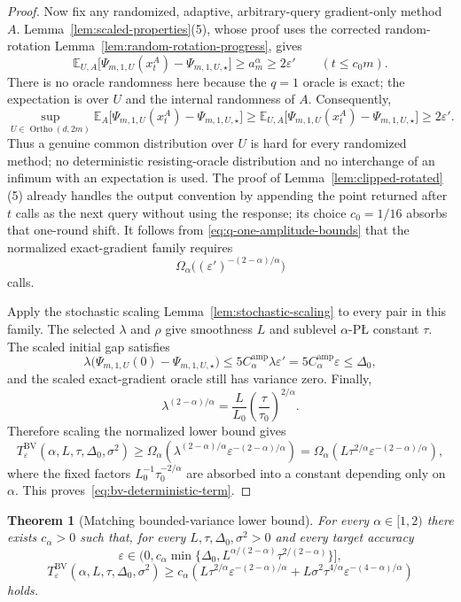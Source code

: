 \documentclass[11pt]{article}
\newtheorem{theorem}{Theorem}[section]
\newcommand{\E}{\mathbb{E}}
\newcommand{\Ortho}{\operatorname{Ortho}}
\begin{document}
\begin{proof}
Now fix any randomized, adaptive, arbitrary-query gradient-only method $A$. Lemma~\ref{lem:scaled-properties}(5),
whose proof uses the corrected random-rotation Lemma~\ref{lem:random-rotation-progress}, gives
\[
\E_{U,A}\bigl[
\Psi_{m,1,U}(x_t^A)-\Psi_{m,1,U,\star}
\bigr]
\ge a_m^\alpha
\ge2\varepsilon'
\qquad
(t\le c_0m).
\]
There is no oracle randomness here because the $q=1$ oracle is exact; the expectation is over $U$ and the internal
randomness of $A$. Consequently,
\[
\sup_{U\in\Ortho(d,2m)}
\E_A\bigl[\Psi_{m,1,U}(x_t^A)-\Psi_{m,1,U,\star}\bigr]
\ge
\E_{U,A}\bigl[\Psi_{m,1,U}(x_t^A)-\Psi_{m,1,U,\star}\bigr]
\ge2\varepsilon'.
\]
Thus a genuine common distribution over $U$ is hard for every randomized method; no deterministic
resisting-oracle distribution and no interchange of an infimum with an expectation is used. The proof of
Lemma~\ref{lem:clipped-rotated}(5) already handles the output convention by appending the point returned after \(t\)
calls as the next query without using the response; its choice \(c_0=1/16\) absorbs that one-round shift. It follows from
\eqref{eq:q-one-amplitude-bounds} that the normalized exact-gradient family requires
\[
\Omega_\alpha\bigl((\varepsilon')^{-(2-\alpha)/\alpha}\bigr)
\]
calls.

Apply the stochastic scaling Lemma~\ref{lem:stochastic-scaling} to every pair in this family. The selected $\lambda$
and $\rho$ give smoothness $L$ and sublevel $\alpha$-P\L{} constant $\tau$. The scaled initial gap satisfies
\[
\lambda\bigl(\Psi_{m,1,U}(0)-\Psi_{m,1,U,\star}\bigr)
\le5C_\alpha^{\mathrm{amp}}\lambda\varepsilon'
=5C_\alpha^{\mathrm{amp}}\varepsilon
\le\Delta_0,
\]
and the scaled exact-gradient oracle still has variance zero. Finally,
\[
\lambda^{(2-\alpha)/\alpha}
=
\frac{L}{L_0}
\left(\frac{\tau}{\tau_0}\right)^{2/\alpha}.
\]
Therefore scaling the normalized lower bound gives
\[
T_\varepsilon^{\mathrm{BV}}(\alpha,L,\tau,\Delta_0,\sigma^2)
\ge
\Omega_\alpha\left(
\lambda^{(2-\alpha)/\alpha}\varepsilon^{-(2-\alpha)/\alpha}
\right)
=
\Omega_\alpha\left(
L\tau^{2/\alpha}\varepsilon^{-(2-\alpha)/\alpha}
\right),
\]
where the fixed factors $L_0^{-1}\tau_0^{-2/\alpha}$ are absorbed into a constant depending only on $\alpha$.
This proves~\eqref{eq:bv-deterministic-term}.
\end{proof}

\begin{theorem}[Matching bounded-variance lower bound]
\label{thm:stochastic-lb}
For every $\alpha\in[1,2)$ there exists $c_\alpha>0$ such that, for every $L,\tau,\Delta_0,\sigma^2>0$ and every
target accuracy
\[
\varepsilon\in\bigl(0,c_\alpha\min\{\Delta_0,L^{\alpha/(2-\alpha)}\tau^{2/(2-\alpha)}\}\bigr],
\]
\[
T_\varepsilon^{\mathrm{BV}}(\alpha,L,\tau,\Delta_0,\sigma^2)
\ge
c_\alpha\left(
L\tau^{2/\alpha}\varepsilon^{-(2-\alpha)/\alpha}
 + L\sigma^2\tau^{4/\alpha}\varepsilon^{-(4-\alpha)/\alpha}
\right)
\]
holds.
\end{theorem}
\end{document}
